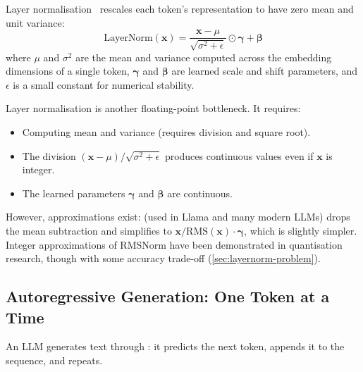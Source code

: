 Layer normalisation~\cite{ba2016layernorm} rescales each token's
representation to have zero mean and unit variance:
\begin{equation}
  \text{LayerNorm}(\bm{x}) =
  \frac{\bm{x} - \mu}{\sqrt{\sigma^2 + \epsilon}} \odot \bm{\gamma} + \bm{\beta}
  \label{eq:layernorm}
\end{equation}
where $\mu$ and $\sigma^2$ are the mean and variance computed across
the embedding dimensions of a single token, $\bm{\gamma}$ and
$\bm{\beta}$ are learned scale and shift parameters, and $\epsilon$
is a small constant for numerical stability.

\begin{engineernote}
Layer normalisation is another floating-point bottleneck. It requires:
\begin{itemize}[leftmargin=1em]
  \item Computing mean and variance (requires division and square root).
  \item The division $(\bm{x} - \mu) / \sqrt{\sigma^2 + \epsilon}$
    produces continuous values even if $\bm{x}$ is integer.
  \item The learned parameters $\bm{\gamma}$ and $\bm{\beta}$ are
    continuous.
\end{itemize}
However, approximations exist:  (used in Llama and
many modern LLMs) drops the mean subtraction and simplifies to
$\bm{x} / \text{RMS}(\bm{x}) \cdot \bm{\gamma}$, which is slightly
simpler. Integer approximations of RMSNorm have been demonstrated
in quantisation research, though with some accuracy trade-off
(\cref{sec:layernorm-problem}).
\end{engineernote}

\subsection{Autoregressive Generation: One Token at a Time}
\label{sec:autoregressive}

An LLM generates text through :
it predicts the next token, appends it to the sequence, and repeats.

